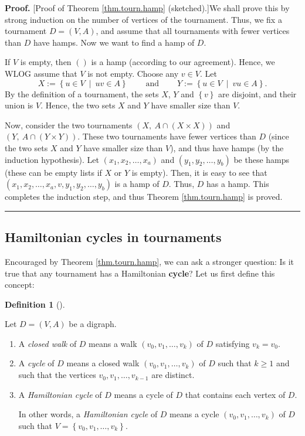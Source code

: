 \documentclass[numbers=enddot,12pt,final,onecolumn,notitlepage]{scrartcl}%
\numberwithin{exer}{subsection}
\theoremstyle{definition}
\newtheorem{defi}[theo]{Definition}
\newenvironment{definition}[1][]
{\begin{defi}[#1]\begin{leftbar}}
{\end{leftbar}\end{defi}}
\newenvironment{proof}[1][Proof]{\noindent\textbf{#1.} }{\ \rule{0.5em}{0.5em}}
\begin{document}
\begin{proof}
[Proof of Theorem \ref{thm.tourn.hamp} (sketched).]We shall prove this by
strong induction on the number of vertices of the tournament. Thus, we fix a
tournament $D=\left(  V,A\right)  $, and assume that all tournaments with
fewer vertices than $D$ have hamps. Now we want to find a hamp of $D$.

If $V$ is empty, then $\left(  {}\right)  $ is a hamp (according to our
agreement). Hence, we WLOG assume that $V$ is not empty. Choose any $v\in V$.
Let%
\[
X:=\left\{  u\in V\ \mid\ uv\in A\right\}  \ \ \ \ \ \ \ \ \ \ \text{and}%
\ \ \ \ \ \ \ \ \ \ Y:=\left\{  u\in V\ \mid\ vu\in A\right\}  .
\]
By the definition of a tournament, the sets $X$, $Y$ and $\left\{  v\right\}
$ are disjoint, and their union is $V$. Hence, the two sets $X$ and $Y$ have
smaller size than $V$.

Now, consider the two tournaments $\left(  X,\ A\cap\left(  X\times X\right)
\right)  $ and $\left(  Y,\ A\cap\left(  Y\times Y\right)  \right)  $. These
two tournaments have fewer vertices than $D$ (since the two sets $X$ and $Y$
have smaller size than $V$), and thus have hamps (by the induction
hypothesis). Let $\left(  x_{1},x_{2},\ldots,x_{a}\right)  $ and $\left(
y_{1},y_{2},\ldots,y_{b}\right)  $ be these hamps (these can be empty lists if
$X$ or $Y$ is empty). Then, it is easy to see that $\left(  x_{1},x_{2}%
,\ldots,x_{a},v,y_{1},y_{2},\ldots,y_{b}\right)  $ is a hamp of $D$. Thus, $D$
has a hamp. This completes the induction step, and thus Theorem
\ref{thm.tourn.hamp} is proved.
\end{proof}

\subsection{Hamiltonian cycles in tournaments}

Encouraged by Theorem \ref{thm.tourn.hamp}, we can ask a stronger question: Is
it true that any tournament has a Hamiltonian \textbf{cycle}? Let us first
define this concept:

\begin{definition}
Let $D=\left(  V,A\right)  $ be a digraph.

\begin{enumerate}
\item[\textbf{(a)}] A \emph{closed walk} of $D$ means a walk $\left(
v_{0},v_{1},\ldots,v_{k}\right)  $ of $D$ satisfying $v_{k}=v_{0}$.

\item[\textbf{(b)}] A \emph{cycle} of $D$ means a closed walk $\left(
v_{0},v_{1},\ldots,v_{k}\right)  $ of $D$ such that $k\geq1$ and such that the
vertices $v_{0},v_{1},\ldots,v_{k-1}$ are distinct.

\item[\textbf{(c)}] A \emph{Hamiltonian cycle} of $D$ means a cycle of $D$
that contains each vertex of $D$.

In other words, a \emph{Hamiltonian cycle} of $D$ means a cycle $\left(
v_{0},v_{1},\ldots,v_{k}\right)  $ of $D$ such that $V=\left\{  v_{0}%
,v_{1},\ldots,v_{k}\right\}  $.
\end{enumerate}
\end{definition}
\end{document}
